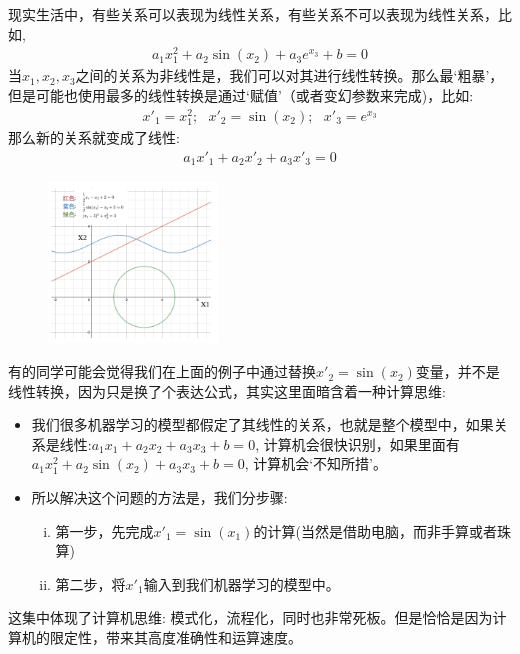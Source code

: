 \documentclass[12pt]{article}
\numberwithin{figure}{section}
\newenvironment{fullmodel}{
			\smallskip\noindent
			\begin{minipage}{\textwidth+\marginparwidth+\marginparsep}\smallskip\smallskip}
			{\smallskip\smallskip\end{minipage}\vspace{.1in}
			}
\numberwithin{equation}{section}
\begin{document}
\begin{remark}
现实生活中，有些关系可以表现为线性关系，有些关系不可以表现为线性关系，比如,
\begin{align*}
	a_1 x_1^2 + a_2 \sin (x_2) + a_3 e^{x_3} + b  = 0 
\end{align*}	
当$x_1, x_2, x_3$之间的关系为非线性是，我们可以对其进行线性转换。那么最`粗暴'，但是可能也使用最多的线性转换是通过`赋值’（或者变幻参数来完成)，比如:
\begin{align*}
	x'_1 = x_1^2; \ \ \ x'_2 = \sin (x_2); \ \ \ x'_3 = e^{x_3}
\end{align*}
那么新的关系就变成了线性: 
\begin{align*}
	a_1 x'_1 + a_2 x'_2 + a_3 x'_3 = 0 
\end{align*}
\end{remark}
\begin{figure}[H]
	\centering
	\includegraphics[width=0.4\textwidth]{fig/C2C2linear}
\end{figure}

\begin{fullmodel}
	\begin{tcolorbox}[title=简单的变量替换可以成为线性转换吗？]
		有的同学可能会觉得我们在上面的例子中通过替换$x'_2 = \sin(x_2)$变量，并不是线性转换，因为只是换了个表达公式，其实这里面暗含着一种计算思维:
		\begin{itemize}
			\item 我们很多机器学习的模型都假定了其线性的关系，也就是整个模型中，如果关系是线性:$a_1 x_1 + a_2 x_2 + a_3 x_3 + b =0$, 计算机会很快识别，如果里面有$a_1 x_1^2 + a_2 \sin(x_2) + a_3 x_3 + b =0$, 计算机会`不知所措'。
			\item 所以解决这个问题的方法是，我们分步骤: \begin{enumerate}[(i)]
				\item 第一步，先完成$x'_1 = \sin(x_1)$的计算(当然是借助电脑，而非手算或者珠算)
				\item 第二步，将$x'_1$输入到我们机器学习的模型中。
			\end{enumerate}
		\end{itemize}
		这集中体现了计算机思维: 模式化，流程化，同时也非常死板。但是恰恰是因为计算机的限定性，带来其高度准确性和运算速度。
	\end{tcolorbox}
\end{fullmodel}
\end{document}
